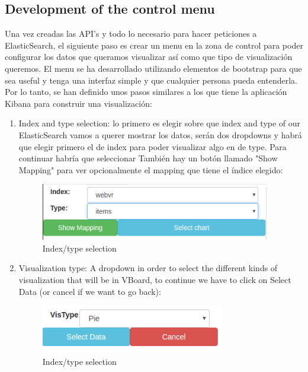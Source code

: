 \documentclass[a4paper, 12pt]{book}
\begin{document}
\subsection{Development of the control menu}

Una vez creadas las API's y todo lo necesario para hacer peticiones a ElasticSearch, el siguiente paso es crear un menu en la zona de control para poder configurar los datos que queramos visualizar así como que tipo de visualización queremos. El menu se ha desarrollado utilizando elementos de bootstrap para que sea useful y tenga una interfaz simple y que cualquier persona pueda entenderla. Por lo tanto, se han definido unos pasos similares a los que tiene la aplicación Kibana para construir una visualización:

\begin{enumerate}
    \item Index and type selection: lo primero es elegir sobre que index and type of our ElasticSearch vamos a querer mostrar los datos, serán dos dropdowns y habrá que elegir primero el de index para poder visualizar algo en de type. Para continuar habría que seleccionar También hay un botón llamado "Show Mapping" para ver opcionalmente el mapping que tiene el índice elegido:
        \begin{figure}[H]
          \centering
          \includegraphics[width=10cm, keepaspectratio]{img/development/indextype}
          \caption{Index/type selection}
          \label{fig:index-type}
        \end{figure}
    \item Visualization type: A dropdown in order to select the different kinds of visualization that will be in VBoard, to continue we have to click on Select Data (or cancel if we want to go back):
        \begin{figure}[H]
          \centering
          \includegraphics[width=8cm, keepaspectratio]{img/development/vistype}
          \caption{Index/type selection}
          \label{fig:vistype}

\end{figure}
\end{enumerate}
\end{document}
